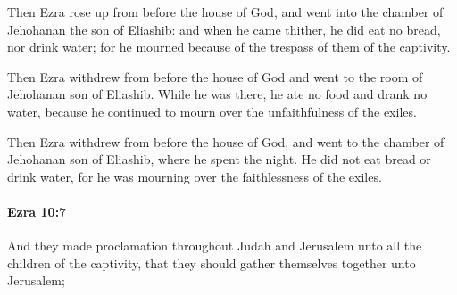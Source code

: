 			\begin{versebox}
					\item[BHS] 
					\item[LXX] 
					\item[ASV] Then Ezra rose up from before the house of God, and went into the chamber of Jehohanan the son of Eliashib: and when he came thither, he did eat no bread, nor drink water; for he mourned because of the trespass of them of the captivity.
					\item[NIV] Then Ezra withdrew from before the house of God and went to the room of Jehohanan son of Eliashib. While he was there, he ate no food and drank no water, because he continued to mourn over the unfaithfulness of the exiles.
					\item[NRSV] Then Ezra withdrew from before the house of God, and went to the chamber of Jehohanan son of Eliashib, where he spent the night. He did not eat bread or drink water, for he was mourning over the faithlessness of the exiles.
			\end{versebox}

		\paragraph{Ezra 10:7} %
			\label{EZRA-10-7}

			And they made proclamation throughout Judah and Jerusalem unto all the children of the captivity, that they should gather themselves together unto Jerusalem;


